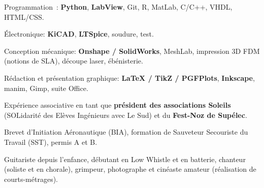 \documentclass[a4paper, 11pt]{moderncv}
\begin{document}
	
	
	
	Programmation~: \textbf{Python}, \textbf{LabView}, Git, R, MatLab, C/C++, VHDL, HTML/CSS.
	
	Électronique: \textbf{KiCAD}, \textbf{LTSpice}, soudure, test.
	
	Conception mécanique: \textbf{Onshape / SolidWorks}, MeshLab, impression 3D FDM (notions de SLA), découpe laser, ébénisterie.
	
	Rédaction et présentation graphique: \textbf{LaTeX / TikZ / PGFPlots}, \textbf{Inkscape}, manim, Gimp, suite Office.
	
	
	Expérience associative en tant que \textbf{président des associations Soleils} (SOLidarité des Elèves Ingénieurs avec Le Sud) et du \textbf{Fest-Noz de Supélec}.
	
	Brevet d’Initiation Aéronautique (BIA), formation de Sauveteur Secouriste du Travail (SST), permis A et B.
	
	Guitariste depuis l’enfance, débutant en Low Whistle et en batterie, chanteur (soliste et en chorale), grimpeur, photographe et cinéaste amateur (réalisation de courts-métrages).
	
	\printbibliography
	
\end{document}
